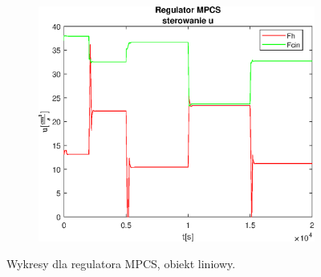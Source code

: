 \begin{figure}[h!]
   \begin{subfigure}[b]{0.4\textwidth}
      \includegraphics[width=1\linewidth]{img/MPCSanaLin/MPCSLinControlN500Nu60l40.eps}
      \caption{}
      \label{fig:fig:MPCSLinN500Nu60l403}
   \end{subfigure}
       
   \caption{Wykresy dla regulatora MPCS, obiekt liniowy.}
   \label{fig:MPCSLinN500Nu60l40}
\end{figure}
           
